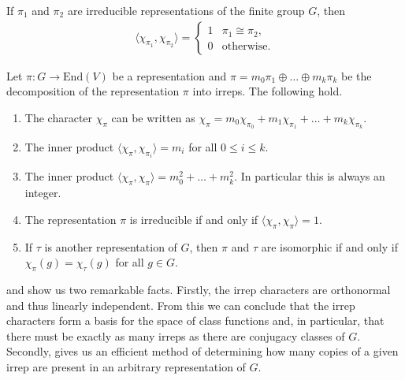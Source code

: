 \begin{lemma} \label{lem:character-orthogonality}
    If $\pi_1$ and $\pi_2$ are irreducible representations of the finite group $G$, then 
    \begin{align}
        \langle \chi_{\pi_1}, \chi_{\pi_2}\rangle = \begin{cases}
            1 & \pi_1 \cong \pi_2, \\
            0 & \text{otherwise}.
        \end{cases}
    \end{align}
\end{lemma}

\begin{cor} \label{cor:character-relations}
    Let $\pi : G \to \mathrm{End}(V)$ be a representation and $\pi = m_0 \pi_1 \oplus \dots \oplus m_k \pi_k$ be the decomposition of the representation $\pi$ into irreps. The following hold.
    \begin{enumerate}
        \item The character $\chi_{\pi}$ can be written as $\chi_{\pi} = m_0 \chi_{\pi_0} + m_1 \chi_{\pi_1} + \dots + m_k \chi_{\pi_k}$.
        \item \label{item:irrep-mult-test} The inner product $\langle \chi_{\pi}, \chi_{\pi_i}\rangle = m_i$ for all $0 \leq i \leq k$.
        \item The inner product $\langle \chi_{\pi}, \chi_{\pi} \rangle = m_0^2 + \dots + m_k^2$. In particular this is always an integer.
        \item The representation $\pi$ is irreducible if and only if $\langle \chi_{\pi}, \chi_{\pi} \rangle = 1$.
        \item If $\tau$ is another representation of $G$, then $\pi$ and $\tau$ are isomorphic if and only if $\chi_{\pi}(g) = \chi_{\tau}(g)$ for all $g \in G$.
    \end{enumerate}
\end{cor}

 and  show us two remarkable facts.
Firstly, the irrep characters are orthonormal and thus linearly independent.
From this we can conclude that the irrep characters form a basis for the space of class functions and, in particular, that there must be exactly as many irreps as there are conjugacy classes of $G$.
Secondly,  gives us an efficient method of determining how many copies of a given irrep are present in an arbitrary representation of $G$.